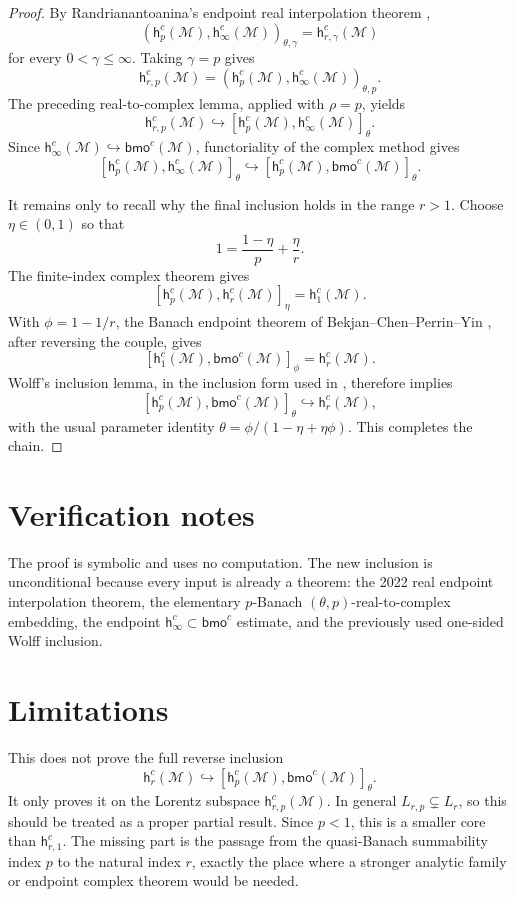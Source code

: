 \documentclass[11pt]{article}
\newcommand{\M}{\mathcal M}
\newcommand{\h}{\mathsf h}
\newcommand{\bmo}{\mathsf{bmo}}
\begin{document}
\begin{proof}
By Randrianantoanina's endpoint real interpolation theorem
\cite[Proposition 2.8]{Ran2022},
\[
(\h_p^c(\M),\h_\infty^c(\M))_{\theta,\gamma}=\h_{r,\gamma}^c(\M)
\]
for every \(0<\gamma\le\infty\). Taking \(\gamma=p\) gives
\[
\h_{r,p}^c(\M)=(\h_p^c(\M),\h_\infty^c(\M))_{\theta,p}.
\]
The preceding real-to-complex lemma, applied with \(\rho=p\), yields
\[
\h_{r,p}^c(\M)\hookrightarrow
[\h_p^c(\M),\h_\infty^c(\M)]_\theta.
\]
Since \(\h_\infty^c(\M)\hookrightarrow\bmo^c(\M)\), functoriality of the complex
method gives
\[
[\h_p^c(\M),\h_\infty^c(\M)]_\theta
\hookrightarrow
[\h_p^c(\M),\bmo^c(\M)]_\theta.
\]

It remains only to recall why the final inclusion holds in the range \(r>1\).
Choose \(\eta\in(0,1)\) so that
\[
1=\frac{1-\eta}{p}+\frac{\eta}{r}.
\]
The finite-index complex theorem \cite[Theorem 3.16]{Ran2021} gives
\[
[\h_p^c(\M),\h_r^c(\M)]_\eta=\h_1^c(\M).
\]
With \(\phi=1-1/r\), the Banach endpoint theorem of
Bekjan--Chen--Perrin--Yin \cite[Theorem 4.4]{BCPY2009}, after reversing the
couple, gives
\[
[\h_1^c(\M),\bmo^c(\M)]_\phi=\h_r^c(\M).
\]
Wolff's inclusion lemma, in the inclusion form used in
\cite[Corollary 3.19]{Ran2021}, therefore implies
\[
[\h_p^c(\M),\bmo^c(\M)]_\theta\hookrightarrow\h_r^c(\M),
\]
with the usual parameter identity
\(\theta=\phi/(1-\eta+\eta\phi)\). This completes the chain.
\end{proof}

\section*{Verification notes}

The proof is symbolic and uses no computation. The new inclusion is
unconditional because every input is already a theorem: the 2022 real endpoint
interpolation theorem, the elementary \(p\)-Banach
\((\theta,p)\)-real-to-complex embedding,
the endpoint \(\h_\infty^c\subset\bmo^c\) estimate, and the previously used
one-sided Wolff inclusion.

\section*{Limitations}

This does not prove the full reverse inclusion
\[
\h_r^c(\M)\hookrightarrow[\h_p^c(\M),\bmo^c(\M)]_\theta.
\]
It only proves it on the Lorentz subspace \(\h_{r,p}^c(\M)\). In general
\(L_{r,p}\subsetneq L_r\), so this should be treated as a proper partial
result. Since \(p<1\), this is a smaller core than \(\h_{r,1}^c\). The missing
part is the passage from the quasi-Banach summability index \(p\) to the
natural index \(r\), exactly the place where a stronger analytic family or
endpoint complex theorem would be needed.
\end{document}
